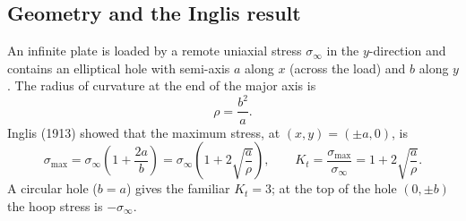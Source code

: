 \documentclass[11pt,a4paper]{article}
\newcommand{\Kt}{K_t}
\begin{document}
\subsection{Geometry and the Inglis result}
An infinite plate is loaded by a remote uniaxial stress $\sigma_\infty$ in the $y$-direction and contains
an elliptical hole with semi-axis $a$ along $x$ (across the load) and $b$ along $y$. The radius of
curvature at the end of the major axis is
\begin{equation}
  \rho = \frac{b^2}{a}.
\end{equation}
Inglis (1913) showed that the maximum stress, at $(x,y)=(\pm a,0)$, is
\begin{equation}\label{eq:inglis}
  \sigma_{\max} = \sigma_\infty\left(1+\frac{2a}{b}\right)
  = \sigma_\infty\left(1+2\sqrt{\frac{a}{\rho}}\right),
  \qquad
  \Kt = \frac{\sigma_{\max}}{\sigma_\infty} = 1 + 2\sqrt{\frac{a}{\rho}} .
\end{equation}
A circular hole ($b=a$) gives the familiar $\Kt=3$; at the top of the hole $(0,\pm b)$ the hoop
stress is $-\sigma_\infty$.
\end{document}
